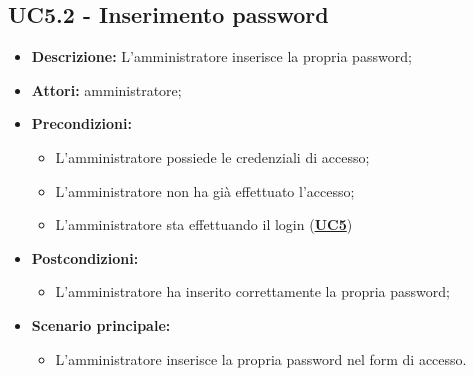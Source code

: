 \documentclass[5pt]{article}
\begin{document}
\subsection{UC5.2 - Inserimento password}
\label{sec:UC5.2}
\begin{itemize}
    \item \textbf{Descrizione:} L’amministratore inserisce la propria password;
    \item \textbf{Attori:} amministratore;
    \item \textbf{Precondizioni:} 
    \begin{itemize}
        \item L’amministratore possiede le credenziali di accesso;
        \item L’amministratore non ha già effettuato l’accesso;
        \item L’amministratore sta effettuando il login (\hyperref[sec:UC5]{\textbf{UC5}})
    \end{itemize}
    \item \textbf{Postcondizioni:} 
    \begin{itemize}
        \item L’amministratore ha inserito correttamente la propria password;
    \end{itemize}
    \item \textbf{Scenario principale:} 
    \begin{itemize}
        \item L’amministratore inserisce la propria password nel form di accesso.
    \end{itemize}
\end{itemize}
\end{document}
